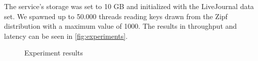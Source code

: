 \documentclass[a4paper,final]{article}
\newcommand{\mono}[1]{{\ttfamily#1}}
\begin{document}
The service's storage was set to 10 GB and initialized with the LiveJournal
data set. We spawned up to 50.000 threads \mono{read}ing keys drawn from the
Zipf distribution with a maximum value of 1000. The results in throughput and
latency can be seen in \autoref{fig:experiments}.

\begin{figure}[h]
    \centering
    \caption{Experiment results}
    \label{fig:experiments}
\end{figure}
\end{document}
